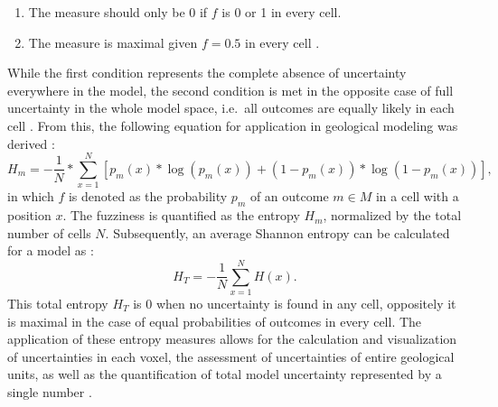         \begin{enumerate}
	        \item The measure should only be 0 if $f$ is 0 or 1 in every cell.
	        \item The measure is maximal given $f = 0.5$ in every cell \citep{de1972definition}.
        \end{enumerate}
        While the first condition represents the complete absence of uncertainty everywhere in the model, the second condition is met in the opposite case of full uncertainty in the whole model space, i.e.\ all outcomes are equally likely in each cell \citep{schaaf2017}. From this, the following equation for application in geological modeling was derived \citep{Mann1993,wellmann2012uncertainties}:
        \begin{equation}
	        H_m = -\frac{1}{N}*\sum_{x=1}^{N}[p_m(x)*\log(p_m(x))+(1-p_m(x))*\log(1-p_m(x))],
        \end{equation}
        in which $f$ is denoted as the probability $p_m$ of an outcome $m\in M$ in a cell with a position $x$. The fuzziness is quantified as the entropy $H_m$, normalized by the total number of cells $N$. Subsequently, an average Shannon entropy can be calculated for a model as \citep{wellmann2012uncertainties}:
        \begin{equation}
	        H_T = -\frac{1}{N}\sum_{x=1}^{N}H(x).
        \end{equation}
        This total entropy $H_T$ is 0 when no uncertainty is found in any cell, oppositely it is maximal in the case of equal probabilities of outcomes in every cell. The application of these entropy measures allows for the calculation and visualization of uncertainties in each voxel, the assessment of uncertainties of entire geological units, as well as the quantification of total model uncertainty represented by a single number \citep{wellmann2012uncertainties}.
        
